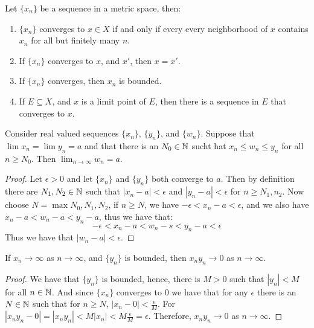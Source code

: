 \begin{theorem}\label{3.1.1}
    Let $\{x_n\}$ be a sequence in a metric space, then:
        \begin{enumerate}[label=(\arabic*)]
            \item $\{x_n\}$ converges to  $x \in X$ if and only if every every neighborhood 
                of $x$ contains  $x_n$ for all but finitely many  $n$.

            \item If  $\{x_n\}$ converges to  $x$, and  $x'$, then $x=x'$.

            \item If  $\{x_n\}$ converges, then  $x_n$ is bounded.

            \item If  $E \subseteq X$, and  $x$ is a limit point of  $E$, then there 
                is a sequence  in  $E$ that converges to  $x$.
        \end{enumerate}
\end{theorem}


\begin{theorem}\label{}

    Consider real valued sequences $\{x_n\}$,  $\{y_n\}$, and  $\{w_n\}$. Suppose that $\lim{x_n}=\lim{y_n}=a$ and that there 
    is an $N_0 \in \mathbb{N}$ sucht hat  $x_n \leq w_n \leq y_n$ for all  $n \geq N_0$. Then  $\lim_{n \rightarrow \infty}{w_n}=a$. 
\end{theorem}
\begin{proof}
    Let $\epsilon>0$ and let  $\{x_n\}$ and  $\{y_n\}$ both converge to  $a$. Then by definition there are  $N_1,N_2 \in \mathbb{N}$ 
    such that $|x_n-a|<\epsilon$ and  $|y_n-a|<\epsilon$ for  $n \geq N_1,n_2$. Now choose $N=\max{N_0,N_1,N_2}$, if 
    $n \geq N$, we have  $-\epsilon<x_n-a<\epsilon$, and we also have  $x_n-a<w_n-a<y_n-a$, thus we have that:
        \begin{equation*}
            -\epsilon<x_n-a<w_n-s<y_n-a<\epsilon
        \end{equation*}
    Thus we have that $|w_n-a|<\epsilon$.
\end{proof}

\begin{corollary}
    If $x_n \rightarrow \infty$ as  $n \rightarrow \infty$, and  $\{y_n\}$ is bounded, then $x_ny_n \rightarrow 0$ as 
    $n \rightarrow \infty$.
\end{corollary}
\begin{proof}
    We have that $\{y_n\}$ is bounded, hence, there is $M>0$ such that  $|y_n|<M$ for all  $n \in \mathbb{N}$. And since $\{x_n\}$ 
    converges to $0$ we have that for any $\epsilon$ there is an  $N \in \mathbb{N}$ such that for  $n \geq N$,  $|x_n-0|<\frac{\epsilon}{M}$.
    For $|x_ny_n-0|=|x_ny_n|<M|x_n|<M\frac{\epsilon}{M}=\epsilon$. Therefore, $x_ny_n \rightarrow 0$ as  $n \rightarrow \infty$.
\end{proof}

